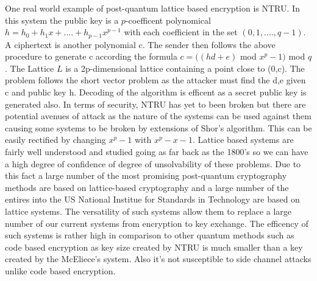 \documentclass[10pt,a4paper]{article}
\begin{document}
\newline
\newline
One real world example of post-quantum lattice based encryption is NTRU. In this system the public key is a \(p\)-coefficent polynomical \( h = h_0 +h_1x+....+h_{p-1}x^{p-1} \) with each coefficient in the set \((0,1,....,q-1)\). A ciphertext is another polynomial c. The sender then follows the above procedure to generate c according the formula \(c =  ((hd + e) \) mod \(x^p-1)\) mod \( q\). The Lattice \(L\) is a 2p-dimensional lattice containing a point close to (0,c). The problem follows the short vector problem as the attacker must find the d,e given c and public key h. Decoding of the algorithm is efficent as a secret public key is generated also.
\newline
In terms of security, NTRU has yet to been broken but there are potential avenues of attack as the nature of the systems can be used against them causing some systems to be broken by extensions of Shor's algorithm. This can be easily rectified by changing \(x^p-1\) with \(x^p-x-1\).
\newline
Lattice based systems are fairly well understood and studied going as far back as the 1800's so we can have a high degree of confidence of degree of unsolvability of these problems. Due to this fact a large number of the most promising post-quantum cryptography methods are based on lattice-based cryptography and a large number of the entires into the US National Institue for Standards in Technology are based on lattice systems. The versatility of such systems allow them to replace a large number of our current systems from encryption to key exchange. The efficency of such systems is rather high in comparison to other quantum methods such as code based encryption as key size created by NTRU is much smaller than a key created by the McEliece's system. Also it's not susceptible to side channel attacks unlike code based encryption.
\end{document}
